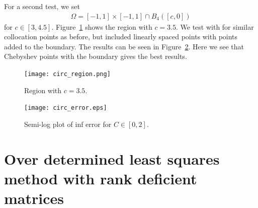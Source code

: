 \documentclass{article}
\begin{document}
For a second test, we set
\begin{align}
\Omega = [-1,1] \times [-1,1] \cap B_{4}([c,0])
\label{circ_region}
\end{align}
for $c \in [3,4.5]$. Figure~\ref{region_circ} shows the region with $c=3.5$. We test with for similar collocation points as before, but included linearly spaced points with points added to the boundary. The results can be seen in Figure~\ref{circ_err_plots}. Here we see that Chebyshev points with the boundary gives the best results.

\begin{figure}[!h]
\centering
\texttt{[image: circ\_region.png]}
\caption{Region with $c=3.5$.}
\label{region_circ}
\end{figure}

\begin{figure}[!h]
\centering
\texttt{[image: circ\_error.eps]}
\caption{Semi-log plot of inf error for $C \in [0,2]$.}
\label{circ_err_plots}
\end{figure}

\section{Over determined least squares method with rank deficient matrices}
\end{document}
